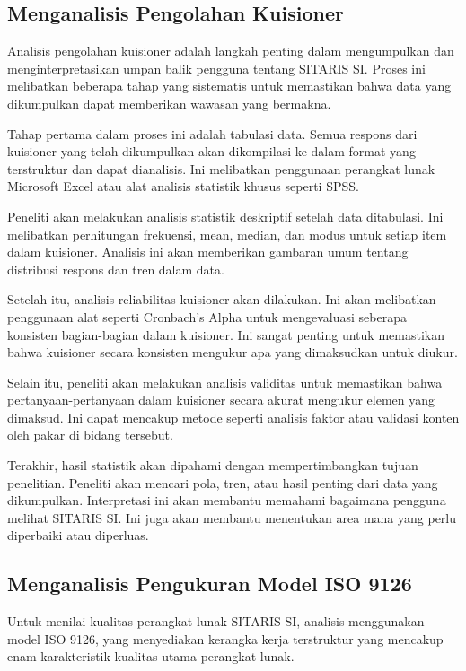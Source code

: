 \subsection{Menganalisis Pengolahan Kuisioner}
Analisis pengolahan kuisioner adalah langkah penting dalam mengumpulkan dan menginterpretasikan umpan balik pengguna tentang SITARIS SI. Proses ini melibatkan beberapa tahap yang sistematis untuk memastikan bahwa data yang dikumpulkan dapat memberikan wawasan yang bermakna.

Tahap pertama dalam proses ini adalah tabulasi data. Semua respons dari kuisioner yang telah dikumpulkan akan dikompilasi ke dalam format yang terstruktur dan dapat dianalisis. Ini melibatkan penggunaan perangkat lunak Microsoft Excel atau alat analisis statistik khusus seperti SPSS.

Peneliti akan melakukan analisis statistik deskriptif setelah data ditabulasi. Ini melibatkan perhitungan frekuensi, mean, median, dan modus untuk setiap item dalam kuisioner. Analisis ini akan memberikan gambaran umum tentang distribusi respons dan tren dalam data.

Setelah itu, analisis reliabilitas kuisioner akan dilakukan. Ini akan melibatkan penggunaan alat seperti Cronbach's Alpha untuk mengevaluasi seberapa konsisten bagian-bagian dalam kuisioner. Ini sangat penting untuk memastikan bahwa kuisioner secara konsisten mengukur apa yang dimaksudkan untuk diukur.

Selain itu, peneliti akan melakukan analisis validitas untuk memastikan bahwa pertanyaan-pertanyaan dalam kuisioner secara akurat mengukur elemen yang dimaksud. Ini dapat mencakup metode seperti analisis faktor atau validasi konten oleh pakar di bidang tersebut.

Terakhir, hasil statistik akan dipahami dengan mempertimbangkan tujuan penelitian. Peneliti akan mencari pola, tren, atau hasil penting dari data yang dikumpulkan. Interpretasi ini akan membantu memahami bagaimana pengguna melihat SITARIS SI. Ini juga akan membantu menentukan area mana yang perlu diperbaiki atau diperluas.

\subsection{Menganalisis Pengukuran Model ISO 9126}
Untuk menilai kualitas perangkat lunak SITARIS SI, analisis menggunakan model ISO 9126, yang menyediakan kerangka kerja terstruktur yang mencakup enam karakteristik kualitas utama perangkat lunak.

